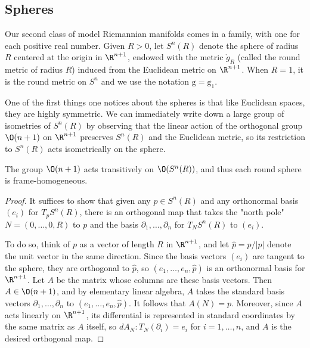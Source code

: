 \subsection{Spheres}
Our second class of model Riemannian manifolds comes in a family, with one for each positive real number. Given $R>0$, let $S^n(R)$ denote the sphere of radius $R$ centered at the origin in $\R^{n+1}$, endowed with the metric $\mathring{g}_R$ (called the round metric of radius $R$) induced from the Euclidean metric on $\R^{n+1}$. When $R=1$, it is the round metric on $S^n$ and we use the notation $\mathrm{g}=\mathrm{g}_1$.\par
One of the first things one notices about the spheres is that like Euclidean spaces, they are highly symmetric. We can immediately write down a large group of isometries of $S^n(R)$ by observing that the linear action of the orthogonal group $\O(n+1)$ on $\R^{n+1}$ preserves $S^n(R)$ and the Euclidean metric, so its restriction to $S^n(R)$ acts isometrically on the sphere.
\begin{proposition}\label{sphere frame homogeneous}
The group $\O(n+1)$ acts transitively on $\O(S^n(R))$, and thus each round sphere is frame-homogeneous.
\end{proposition}
\begin{proof}
It suffices to show that given any $p\in S^n(R)$ and any orthonormal basis $(e_i)$ for $T_pS^n(R)$, there is an orthogonal map that takes the "north pole" $N=(0,\dots,0,R)$ to $p$ and the basis $\partial_1,\dots,\partial_n$ 
for $T_NS^n(R)$ to $(e_i)$.\par
To do so, think of $p$ as a vector of length $R$ in $\R^{n+1}$, and let 
$\hat{p}=p/|p|$ denote the unit vector in the same direction. Since the basis vectors $(e_i)$ are tangent to the sphere, they are orthogonal to $\hat{p}$, so $(e_1,\dots,e_n,\hat{p})$ is an orthonormal basis for $\R^{n+1}$. Let $A$ be the matrix whose columns are these basis vectors. Then $A\in\O(n+1)$, and by elementary linear algebra, $A$ takes the standard basis vectors $\partial_1,\dots,\partial_n$ to $(e_1,\dots,e_n,\hat{p})$. It follows that $A(N)=p$. Moreover, since $A$ acts linearly on $\R^{n+1}$, its differential is represented in standard coordinates by the same matrix as $A$ itself, so $dA_N:T_N(\partial_i)=e_i$ for $i=1,\dots,n$, and $A$ is the desired orthogonal map.
\end{proof}
